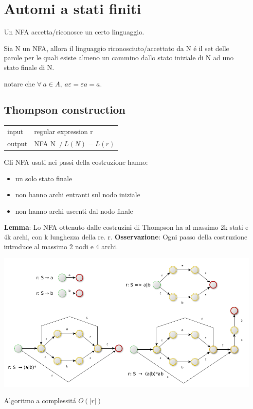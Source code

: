 \chapter{Automi a stati finiti}

Un NFA accetta/riconosce un certo linguaggio.

Sia N un NFA, allora il linguaggio riconosciuto/accettato da N \'e il set delle parole per le quali esiste almeno un cammino dallo stato iniziale di N ad uno stato finale di N.

notare che $\forall\ a \in A,\ a\varepsilon = \varepsilon a = a$.

\section{Thompson construction}
\begin{center}
    \begin{tabular}{ll}
        input & regular expression r\\
        output & NFA N $\ / \ L(N) = L(r)$\\ 
    \end{tabular}
\end{center}
Gli NFA usati nei passi della costruzione hanno:
\begin{itemize}
    \item un solo stato finale\\ 
    \item non hanno archi entranti sul nodo iniziale\\ 
    \item non hanno archi uscenti dal nodo finale\\
\end{itemize}

\textbf{Lemma}: Lo NFA ottenuto dalle costruzini di Thompson ha al massimo 2k stati e 4k archi, con k lunghezza della re. r.
\textbf{Osservazione}: Ogni passo della costruzione introduce al massimo 2 nodi e 4 archi.

\begin{center}
	\includegraphics[scale=0.4]{Chapters/Img/c02_01.png}\\
\end{center} 
Algoritmo a complessit\'a $O(|r|)$ 

